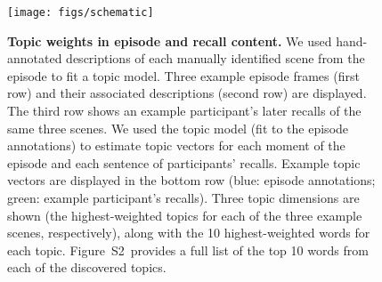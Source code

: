 \documentclass{article}
\newcommand{\topics}{S2}
\begin{document}
\begin{figure}[tp]
\centering
\texttt{[image: figs/schematic]}
\caption{\small \textbf{Topic weights in episode and recall content.} We used hand-annotated descriptions of each manually identified scene from the episode to fit a topic model.  Three example episode frames (first row) and their associated descriptions (second row) are displayed.  The third row shows an example participant's later recalls of the same three scenes.  We used the topic model (fit to the episode annotations) to estimate topic vectors for each moment of the episode and each sentence of participants' recalls.  Example topic vectors are displayed in the bottom row (blue: episode annotations; green: example participant's recalls).  Three topic dimensions are shown (the highest-weighted topics for each of the three example scenes, respectively), along with the 10 highest-weighted words for each topic.  Figure~\topics~provides a full list of the top 10 words from each of the discovered topics.}
\label{fig:schematic}
\end{figure}
\end{document}
